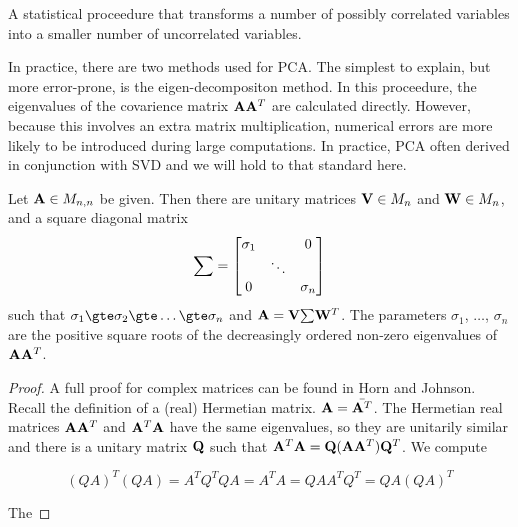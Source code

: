 \begin{definition}
  A statistical proceedure that transforms a number of possibly correlated variables into a smaller number of uncorrelated variables.
\end{definition}

In practice, there are two methods used for \gls{PCA}.  The simplest to explain, but more error-prone, is the eigen-decompositon
method\cite{}.  In this proceedure, the eigenvalues of the covarience matrix $\mathbf{A}\mathbf{A}^T$ are calculated directly.  However,
because this involves an extra matrix multiplication, numerical errors are more likely to be introduced during large computations.
In practice, \gls{PCA} often derived in conjunction with \gls{SVD} and we will hold to that standard here.

\begin{theorem}
  Let $\mathbf{A} \in M_{n,n}$ be given. Then there are unitary matrices $\mathbf{V} \in M_n$ and $\mathbf{W} \in M_n$, and a square diagonal
  matrix
  \[
    \mathbf{\sum} =
      \begin{bmatrix}
        \sigma_1 &        & 0        \\
                 & \ddots &          \\
        0        &        & \sigma_n \\
      \end{bmatrix}
  \]
  such that $\sigma_1 \gte \sigma_2 \gte \hdots \gte \sigma_n$ and $\mathbf{A} = \mathbf{V}\mathbf{\sum}\mathbf{W}^T$.  The parameters $\sigma_1$,
  $\hdots$, $\sigma_n$ are the positive square roots of the decreasingly ordered non-zero eigenvalues of $\mathbf{A}\mathbf{A}^T$.
\end{theorem}

\begin{proof}
  A full proof for complex matrices can be found in Horn and Johnson\cite{horn2013}.  Recall the definition of a (real) Hermetian matrix.
  $\mathbf{A} = \bar{\mathbf{A}^T}$.  The Hermetian real matrices $\mathbf{A}\mathbf{A}^T$ and $\mathbf{A}^T\mathbf{A}$ have the same eigenvalues,
  so they are unitarily similar and there is a unitary matrix
  $\mathbf{Q}$ such that $\mathbf{A}^T\mathbf{A} = \mathbf{Q}(\mathbf{A}\mathbf{A}^T)\mathbf{Q}^T$.  We compute

  \[
    {(QA)}^T(QA) = {A}^{T}{Q}^TQA = {A}^TA = QA{A}^T{Q}^T = QA(QA)^T
  \]

  The

\end{proof}


